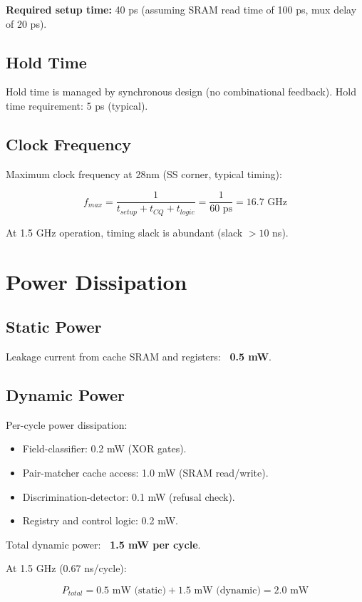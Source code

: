 \documentclass[11pt,oneside]{article}
\begin{document}
\textbf{Required setup time:} 40 ps (assuming SRAM read time of 100 ps, mux delay of 20 ps).

\subsection{Hold Time}

Hold time is managed by synchronous design (no combinational feedback). Hold time requirement: 5 ps (typical).

\subsection{Clock Frequency}

Maximum clock frequency at 28nm (SS corner, typical timing):

\[
f_{max} = \frac{1}{t_{setup} + t_{CQ} + t_{logic}} = \frac{1}{60 \text{ ps}} = 16.7 \text{ GHz}
\]

At 1.5 GHz operation, timing slack is abundant (slack $> 10$ ns).

\section{Power Dissipation}

\subsection{Static Power}

Leakage current from cache SRAM and registers: \textbf{~0.5 mW}.

\subsection{Dynamic Power}

Per-cycle power dissipation:
\begin{itemize}
\item Field-classifier: 0.2 mW (XOR gates).
\item Pair-matcher cache access: 1.0 mW (SRAM read/write).
\item Discrimination-detector: 0.1 mW (refusal check).
\item Registry and control logic: 0.2 mW.
\end{itemize}

Total dynamic power: \textbf{~1.5 mW per cycle}.

At 1.5 GHz (0.67 ns/cycle):

\[
P_{total} = 0.5 \text{ mW (static)} + 1.5 \text{ mW (dynamic)} = 2.0 \text{ mW}
\]
\end{document}
